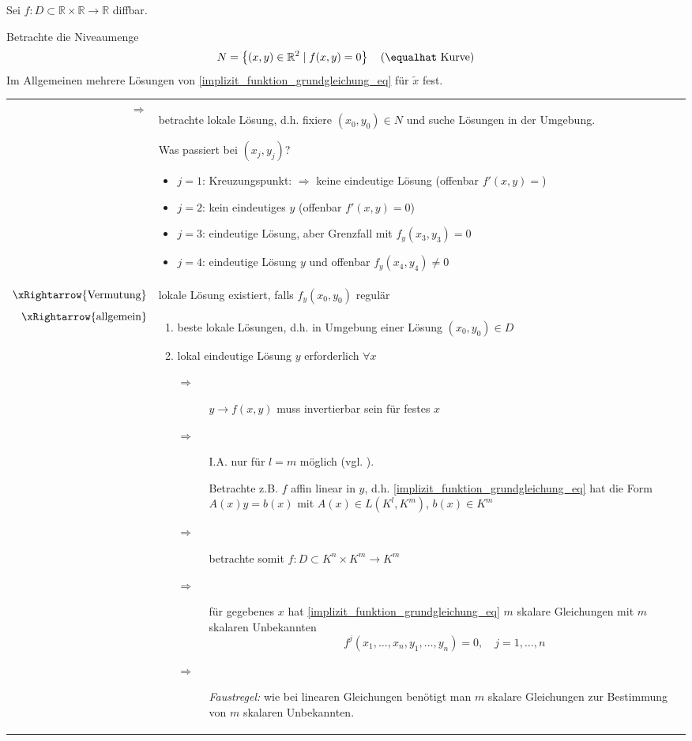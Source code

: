 \begin{example}
	Sei $f:D\subset\mathbb{R}\times\mathbb{R}\to\mathbb{R}$ \gls{diffbar}.
	
	Betrachte die Niveaumenge \begin{align*}
		N= \left\{ (x,y)\in\mathbb{R}^2 \mid f(x,y) = 0 \right\} \quad\text{($\equalhat$ Kurve)}
	\end{align*}
	Im Allgemeinen mehrere Lösungen von \eqref{implizit_funktion_grundgleichung_eq}  für $\tilde{x}$ fest. \\
	\begin{tabularx}{\linewidth}{r@{\ \ }X}
		$\Rightarrow$ & betrachte lokale Lösung, d.h. fixiere $(x_0, y_0)\in N$ und suche Lösungen in der Umgebung.
		
		Was passiert bei $(x_j, y_j)$?\begin{itemize}
			\item $j=1$: Kreuzungspunkt: $\Rightarrow$ keine eindeutige Lösung (offenbar $f'(x,y)=$)
			\item $j=2$: kein eindeutiges $y$ (offenbar $f'(x,y) = 0$)
			\item $j=3$: eindeutige Lösung, aber Grenzfall mit $f_y(x_3, y_3) = 0$
			\item $j=4$: eindeutige Lösung $y$ und offenbar $f_y(x_4, y_4)\neq 0$
		\end{itemize}
		\\
		$\xRightarrow{\text{Vermutung}}$ & lokale Lösung existiert, falls $f_y(x_0, y_0)$ regulär \\
		$\xRightarrow{\text{allgemein}}$ &
		\vspace*{\dimexpr -\baselineskip*2/3}
		\begin{enumerate}[label={\alph*)}]
			\item beste lokale Lösungen, d.h. in Umgebung einer Lösung $(x_0, y_0)\in D$
			\item lokal eindeutige Lösung $y$ erforderlich $\forall x$
			
			\begin{description}
				\item[$\Rightarrow$] $y\to f(x,y)$ muss invertierbar sein für festes $x$ 
				\item[$\Rightarrow$] I.A. nur für $l=m$ möglich (vgl. \propref{implizit_funktion_lemma_3}).
				
				Betrachte z.B. $f$ affin linear in $y$, d.h. \eqref{implizit_funktion_grundgleichung_eq} hat die Form $A(x)y = b(x)$ mit $A(x)\in L(K^l, K^m)$, $b(x)\in K^m$
				\item[$\Rightarrow$] betrachte somit $f:D\subset K^n\times K^m\to K^m$
				\item[$\Rightarrow$] für gegebenes $x$ hat \eqref{implizit_funktion_grundgleichung_eq} $m$ skalare Gleichungen mit $m$ skalaren Unbekannten
				\[f^j(x_1, \dotsc, x_n, y_1, \dotsc, y_n) = 0,\quad j=1,\dotsc,n \]
				\item[$\Rightarrow$] \emph{Faustregel:} wie bei linearen Gleichungen benötigt man $m$ skalare Gleichungen zur Bestimmung von $m$ skalaren Unbekannten.
				

\end{description}
\end{enumerate}
\end{tabularx}
\end{example}
